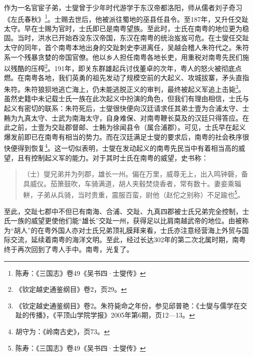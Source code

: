 作为一名官宦子弟，士燮曾于少年时代游学于东汉帝都洛阳，师从儒者刘子奇习《左氏春秋》\footnote{陈寿：《三国志》卷49《吴书四·士燮传》}。士赐去世后，他被派往蜀地的巫县任县令。至187年，又升任交趾太守。早在士赐为官时，士氏即已是南粤望族。至此时，士氏在南粤的地位更为稳固。当时，洪水已开始吞没东汉帝国，东汉在南粤的统治岌岌可危。在士燮任交趾太守的同年，首个南粤本地出身的交趾刺史李进离任，吴越会稽人朱符代之。朱符系一个残暴贪婪的帝国官僚。他以乡人担任南粤各地长吏，用重税对南粤先民们施以残酷的压榨\footnote{《钦定越史通鉴纲目》卷2，页29。}。191年，即关东群雄起兵讨伐董卓的次年，粤人的怒火被彻底点燃。在南粤各地，我们英勇的祖先发动了规模空前的大起义、攻城拔寨，矛头直指朱符。朱符狼狈地逃亡海上，仍未能逃脱正义的审判，最终被起义军追上击毙\footnote{《钦定越史通鉴纲目》卷2。朱符毙命之年份，参见邱普艳：《士燮与儒学在交趾的传播》，《平顶山学院学报》2005年第6期，页12—13。}。虽然史籍中未记载士氏一族在此次起义中扮演的角色，但我们有理由相信，士氏与起义有密切的联系：朱符死后，士燮很快便向汉廷请求任其弟士壹为合浦太守、士䵋为九真太守、士武为南海太守，自身难保、对南粤鞭长莫及的汉廷只得答应。在此之前，士壹为交趾郡督邮、士䵋为徐闻县令（属合浦郡）。可见，士氏早在起义爆发前即已在南粤有相当的势力。而在汉廷满足士燮的要求后，南粤的社会秩序很快便得到恢复\footnote{胡守为：《岭南古史》，页73。}。这一切似表明，士燮在发动起义的南粤先民当中有着相当高的威望，且有控制起义军的能力。对于其时士氏在南粤的威望，史书称：

\begin{quote}
	（士）燮兄弟并为列郡，雄长一州。偏在万里，威尊无上，出入鸣钟磬，备具威仪。茄箫鼓吹，车骑满道，胡人夹毂焚烧香者，常有数十。妻妾乘辎軿，子弟从兵骑，当时贵重，震服百蛮，尉他（赵佗之别称）不足踰也\footnote{陈寿：《三国志》卷49《吴书四·士燮传》}。
\end{quote}

至此，交趾七郡中不但已有南海、合浦、交趾、九真四郡被士氏兄弟完全控制，士氏一族的威望更使他们能“雄长”交趾一州，获得足以比肩南越武帝的地位。由被称为“胡人”的在粤外国人亦对士氏兄弟顶礼膜拜来看，士氏亦注意经营海上外贸与国际交流，延续着南粤的海洋文明。至此，经过长达302年的第二次北属时期，南粤终于再次回到了粤人手中。南粤，光复了。

